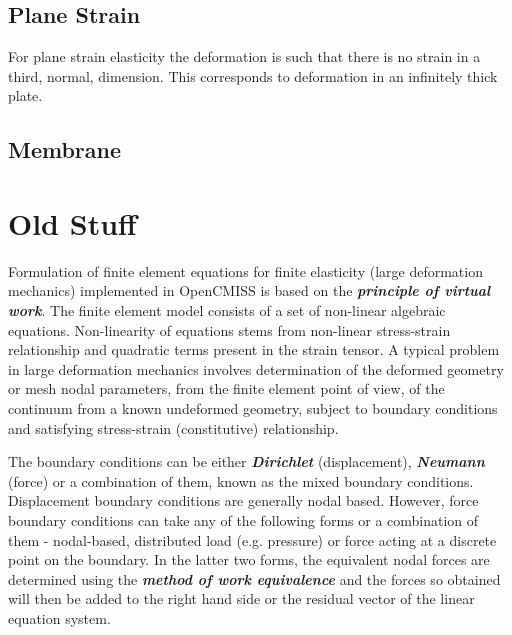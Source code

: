 \subsection{Plane Strain}
\label{subsec:FiniteElasticityPlaneStrain}

For plane strain elasticity the deformation is such that there is no
strain in a third, normal, dimension. This corresponds to deformation
in an infinitely thick plate.

\subsection{Membrane}
\label{subsec:FiniteElasticityMembrane}

\subsection{\Onedal}
\label{subsec:FiniteElasticityOneDimension}


\clearemptydoublepage


\section{Old Stuff}

Formulation of finite element equations for finite elasticity (large
deformation mechanics) implemented in OpenCMISS is based on the
\textit{\textbf{principle of virtual work}}. The finite element model consists
of a set of non-linear algebraic equations. Non-linearity of equations stems
from non-linear stress-strain relationship and quadratic terms present in the
strain tensor. A typical problem in large deformation mechanics involves
determination of the deformed geometry or mesh nodal parameters, from the
finite element point of view, of the continuum from a known undeformed
geometry, subject to boundary conditions and satisfying stress-strain
(constitutive) relationship.
  
The boundary conditions can be either \textit{\textbf{Dirichlet}}
(displacement), \textit{\textbf{Neumann}} (force) or a combination of them,
known as the mixed boundary conditions. Displacement boundary conditions are
generally nodal based. However, force boundary conditions can take any of the
following forms or a combination of them - nodal-based, distributed load
(e.g. pressure) or force acting at a discrete point on the boundary. In the
latter two forms, the equivalent nodal forces are determined using the
\textit{\textbf{method of work equivalence}} \citep{hutton:2004} and the forces
so obtained will then be added to the right hand side or the residual vector
of the linear equation system.

